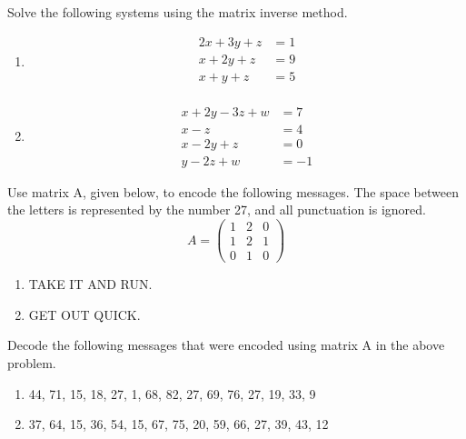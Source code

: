 \begin{puzzle} Solve the following systems using the matrix inverse method.
    \begin{enumerate}
        \item
              \[\begin{aligned}
                      2x + 3y + z & = 1 \\
                      x  + 2y + z & = 9 \\
                      x  +  y + z & = 5 \\
                  \end{aligned}\]

        \item
              \[\begin{aligned}
                      x  + 2y - 3z + w & = 7  \\
                      x  - z           & = 4  \\
                      x  - 2y + z      & = 0  \\
                      y  - 2z + w      & = -1
                  \end{aligned}\]
    \end{enumerate}
\end{puzzle}

\begin{puzzle}{Use matrix A, given below, to encode the following messages. The space between the letters is represented by the number 27, and all punctuation is ignored.}
    \[ A = \begin{pmatrix}
            1 & 2 & 0 \\
            1 & 2 & 1 \\
            0 & 1 & 0
        \end{pmatrix} \]
    \begin{enumerate}
        \item TAKE IT AND RUN.
        \item GET OUT QUICK.
    \end{enumerate}
\end{puzzle}

\begin{puzzle}{Decode the following messages that were encoded using matrix A in the above problem.}
    \begin{enumerate}
        \item 44, 71, 15, 18, 27, 1, 68, 82, 27, 69, 76, 27, 19, 33, 9
        \item 37, 64, 15, 36, 54, 15, 67, 75, 20, 59, 66, 27, 39, 43, 12
    \end{enumerate}
\end{puzzle}


